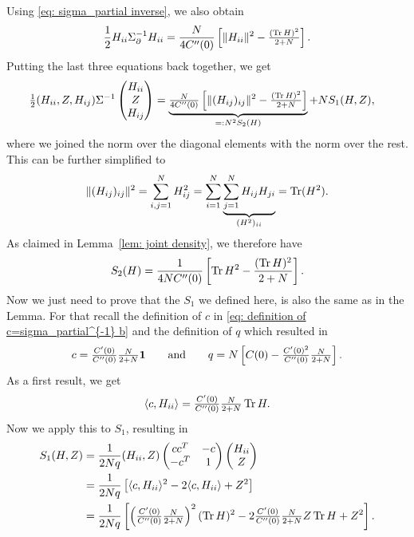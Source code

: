 Using \eqref{eq: sigma_partial inverse}, we also obtain
\[
	\frac12 H_{ii} \Sigma_\partial^{-1} H_{ii}
	= \frac{N}{4C''(0)}
	\left[\|H_{ii}\|^2 - \tfrac{(\operatorname{Tr} H)^2}{2+N}\right].
\]
Putting the last three equations back together, we get
\begin{align*}
		\tfrac12
		( H_{ii},Z, H_{ij} )\Sigma^{-1}
		\begin{pmatrix}
			H_{ii}\\
			Z\\
			H_{ij}
		\end{pmatrix}
		&= \underbrace{
			\tfrac{N}{4C''(0)}\left[
			\|(H_{ij})_{ij}\|^2
			- \tfrac{(\operatorname{Tr} H)^2}{2+N}
		\right]
		}_{=: N^2 S_2(H)}
		+ N S_1(H,Z),
\end{align*}
where we joined the norm over the diagonal elements with the norm over the rest.
This can be further simplified to
\begin{align*}
	\|(H_{ij})_{ij}\|^2 = \sum_{i,j=1}^N H_{ij}^2
	= \sum_{i=1}^N \underbrace{\sum_{j=1}^N H_{ij}H_{ji}}_{(H^2)_{ii}}
	= \operatorname{Tr}(H^2).
\end{align*}
As claimed in Lemma~\ref{lem: joint density}, we therefore have
\[
	S_2(H) = \frac{1}{4 N C''(0)} \left[
		\operatorname{Tr} H^2 - \frac{(\operatorname{Tr} H)^2}{2+N}
	\right].
\]
Now we just need to prove that the \(S_1\) we defined here, is also the same as
in the Lemma. For that recall the definition of \(c\) in \eqref{eq: definition of
c=sigma_partial^{-1} b} and the definition of \(q\) which resulted in
\[
	c=\tfrac{C'(0)}{C''(0)}\tfrac{N}{2+N}\mathbf{1}
	\qquad \text{and} \qquad
	q=N\left[
		C(0) - \tfrac{C'(0)^2}{C''(0)}
		\tfrac{N}{2+N}
	\right].
\]
As a first result, we get
\[
	\langle c, H_{ii}\rangle = 
	\tfrac{C'(0)}{C''(0)}\tfrac{N}{2+N}\operatorname{Tr} H.
\]
Now we apply this to \(S_1\), resulting in
\begin{align*}
	S_1(H, Z)
	&= \frac{1}{2N q}
	(H_{ii},Z)
	\begin{pmatrix}
		cc^T & -c \\
		-c^T & 1
	\end{pmatrix}
	\begin{pmatrix}
		H_{ii}\\ Z
	\end{pmatrix}\\
	&= \frac1{2N q}
	\left[\langle c, H_{ii}\rangle^2 - 2\langle c, H_{ii}\rangle + Z^2\right]
	\\
	&= \frac1{2N q}
	\left[
		\left(\tfrac{C'(0)}{C''(0)}\tfrac{N}{2+N}\right)^2(\operatorname{Tr} H)^2
		- 2\tfrac{C'(0)}{C''(0)}\tfrac{N}{2+N} Z\operatorname{Tr} H
		+ Z^2
	\right].
\end{align*}
